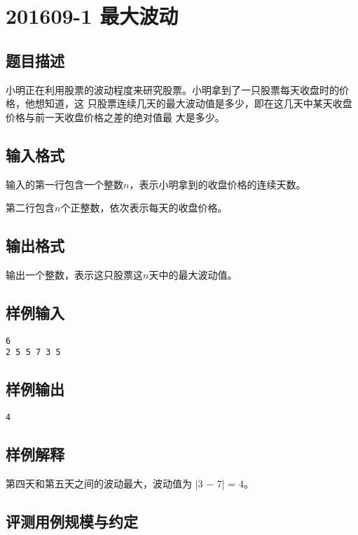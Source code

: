 \section{201609-1 最大波动}

\subsection{题目描述}%
小明正在利用股票的波动程度来研究股票。小明拿到了一只股票每天收盘时的价格，他想知道，这
只股票连续几天的最大波动值是多少，即在这几天中某天收盘价格与前一天收盘价格之差的绝对值最
大是多少。
\subsection{输入格式}

输入的第一行包含一个整数$n$，表示小明拿到的收盘价格的连续天数。

第二行包含$n$个正整数，依次表示每天的收盘价格。

\subsection{输出格式}

输出一个整数，表示这只股票这$n$天中的最大波动值。

\subsection{样例输入}

\begin{lstlisting}[numbers=none]
6
2 5 5 7 3 5
\end{lstlisting}

\subsection{样例输出}

\begin{lstlisting}[numbers=none]
4
\end{lstlisting}

\subsection{样例解释}

第四天和第五天之间的波动最大，波动值为 |3 − 7| = 4。

\subsection{评测用例规模与约定}


